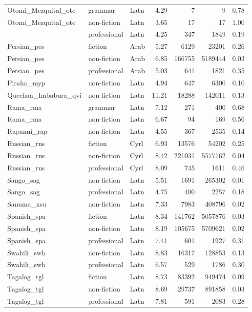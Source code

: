 \begin{longtable}{lllrrrr}
  Otomi\_Mezquital\_ote & grammar & Latn & 4.29 & 7 & 9 & 0.78 \\ 
  Otomi\_Mezquital\_ote & non-fiction & Latn & 3.65 & 17 & 17 & 1.00 \\ 
   & professional & Latn & 4.25 & 347 & 1849 & 0.19 \\ 
  Persian\_pes & fiction & Arab & 5.27 & 6129 & 23201 & 0.26 \\ 
  Persian\_pes & non-fiction & Arab & 6.85 & 166755 & 5189444 & 0.03 \\ 
  Persian\_pes & professional & Arab & 5.03 & 641 & 1821 & 0.35 \\ 
  Piraha\_myp & non-fiction & Latn & 4.94 & 647 & 6300 & 0.10 \\ 
  Quechua\_Imbabura\_qvi & non-fiction & Latn & 11.21 & 18288 & 142011 & 0.13 \\ 
  Rama\_rma & grammar & Latn & 7.12 & 271 & 400 & 0.68 \\ 
  Rama\_rma & non-fiction & Latn & 6.67 & 94 & 169 & 0.56 \\ 
  Rapanui\_rap & non-fiction & Latn & 4.55 & 367 & 2535 & 0.14 \\ 
  Russian\_rus & fiction & Cyrl & 6.93 & 13576 & 54202 & 0.25 \\ 
  Russian\_rus & non-fiction & Cyrl & 8.42 & 221031 & 5577162 & 0.04 \\ 
  Russian\_rus & professional & Cyrl & 8.09 & 745 & 1611 & 0.46 \\ 
  Sango\_sag & non-fiction & Latn & 5.51 & 1691 & 265302 & 0.01 \\ 
  Sango\_sag & professional & Latn & 4.75 & 400 & 2257 & 0.18 \\ 
  Sanuma\_xsu & non-fiction & Latn & 7.33 & 7983 & 408796 & 0.02 \\ 
  Spanish\_spa & fiction & Latn & 8.34 & 141762 & 5057876 & 0.03 \\ 
  Spanish\_spa & non-fiction & Latn & 8.19 & 105675 & 5709621 & 0.02 \\ 
  Spanish\_spa & professional & Latn & 7.41 & 601 & 1927 & 0.31 \\ 
  Swahili\_swh & non-fiction & Latn & 8.83 & 16317 & 128853 & 0.13 \\ 
  Swahili\_swh & professional & Latn & 6.57 & 529 & 1786 & 0.30 \\ 
  Tagalog\_tgl & fiction & Latn & 8.73 & 83392 & 949474 & 0.09 \\ 
  Tagalog\_tgl & non-fiction & Latn & 8.69 & 29737 & 891858 & 0.03 \\ 
  Tagalog\_tgl & professional & Latn & 7.81 & 591 & 2083 & 0.28 \\ 

\end{longtable}
